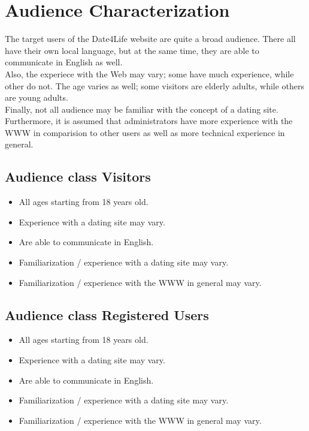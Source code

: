 \documentclass[11pt, a4paper,svglistings,oneside]{book}
\begin{document}
\section{Audience Characterization}

The target users of the Date4Life website are quite a broad audience. There all have their own local language, but at the same time, they are able to communicate in English as well. \\
Also, the experiece with the Web may vary; some have much experience, while other do not. The age varies as well; some visitors are elderly adults, while others are young adults. \\
Finally, not all audience may be familiar with the concept of a dating site. Furthermore, it is assumed that administrators have more experience with the WWW in comparision to other users as well as more technical experience in general.

\subsection{Audience class Visitors}

\begin{itemize}
\item All ages starting from 18 years old.
\item Experience with a dating site may vary.
\item Are able to communicate in English.
\item Familiarization / experience with a dating site may vary.
\item Familiarization / experience with the WWW in general may vary.
\end{itemize}

\subsection{Audience class Registered Users}

\begin{itemize}
\item All ages starting from 18 years old.
\item Experience with a dating site may vary.
\item Are able to communicate in English.
\item Familiarization / experience with a dating site may vary.
\item Familiarization / experience with the WWW in general may vary.
\end{itemize}
\end{document}
